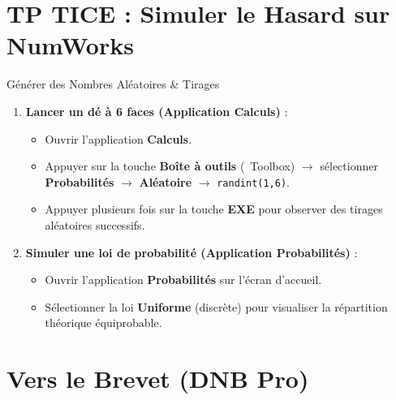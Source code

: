 \section{TP TICE : Simuler le Hasard sur NumWorks}

\begin{tpinfo}{Générer des Nombres Aléatoires \& Tirages}
\begin{enumerate}[leftmargin=1.5em, itemsep=2pt]
    \item \textbf{Lancer un dé à 6 faces (Application Calculs)} :
    \begin{itemize}
        \item Ouvrir l'application \textbf{Calculs}.
        \item Appuyer sur la touche \textbf{Boîte à outils} (\faTools\ Toolbox) $\rightarrow$ sélectionner \textbf{Probabilités} $\rightarrow$ \textbf{Aléatoire} $\rightarrow$ \texttt{randint(1,6)}.
        \item Appuyer plusieurs fois sur la touche \textbf{EXE} pour observer des tirages aléatoires successifs.
    \end{itemize}
    \item \textbf{Simuler une loi de probabilité (Application Probabilités)} :
    \begin{itemize}
        \item Ouvrir l'application \textbf{Probabilités} sur l'écran d'accueil.
        \item Sélectionner la loi \textbf{Uniforme} (discrète) pour visualiser la répartition théorique équiprobable.
    \end{itemize}
\end{enumerate}
\end{tpinfo}

\newpage

\section{Vers le Brevet (DNB Pro)}


